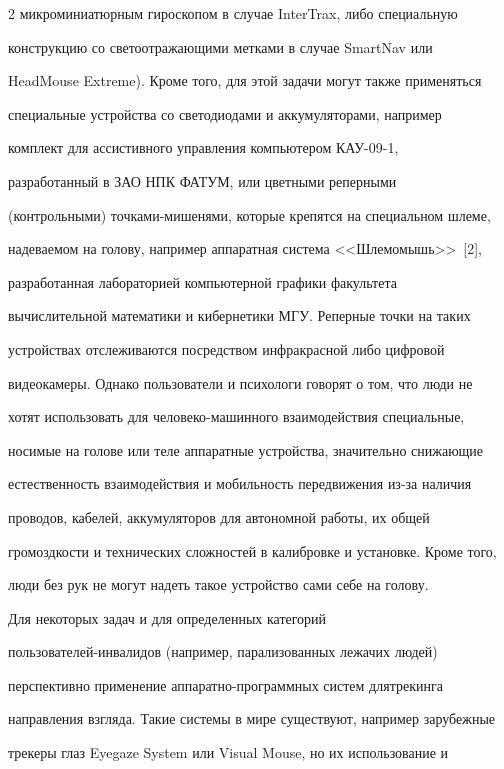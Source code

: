 \begin{multicols}{2}
микроминиатюрным гироскопом в случае InterTrax, либо специальную 


конструкцию со светоотражающими метками в случае SmartNav или 


HeadMouse Extreme). Кроме того, для этой задачи могут также применяться 


специальные устройства со светодиодами и аккумуляторами, например 


комплект для ассистивного управления компьютером КАУ-09-1, 


разработанный в ЗАО НПК ФАТУМ, или цветными реперными 


(контрольными) точками-мишенями, которые крепятся на специальном шлеме, 


на\-де\-ва\-емом на голову, например аппаратная система <<Шлемомышь>>~[2], 


разработанная лабораторией компьютерной графики факультета 


вычислительной математики и кибернетики МГУ. Реперные точки на таких 


устройствах отслеживаются посредством инфракрасной либо цифровой 


видеокамеры. Однако пользователи и психологи говорят о том, что люди не 


хотят использовать для человеко-машинного взаимодействия специальные, 


носимые на голове или теле аппаратные устройства, значительно снижающие 


естественность взаимодействия и мобильность передвижения из-за наличия 


проводов, кабелей, аккумуляторов для автономной работы, их общей 


громоздкости и технических сложностей в калибровке и установке. Кроме того, 


люди без рук не могут надеть такое устройство сами себе на голову.


  


  Для некоторых задач и для определенных категорий 


  пользователей-инвалидов (например, парализованных лежачих людей) 


перспективно применение аппаратно-программных систем для\linebreak трекинга 


направления взгляда. Такие системы в мире существуют, например зарубежные 


трекеры глаз Eyegaze System или Visual Mouse, но их использование и 



\end{multicols}
